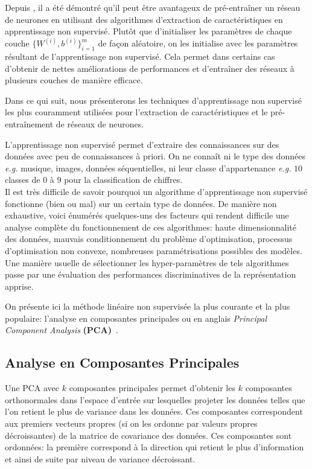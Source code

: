 Depuis \citep{Hinton06,Bengio-nips-2006}, il a été démontré qu'il peut être
avantageux de pré-entraîner un réseau de neurones en utilisant des algorithmes
d'extraction de caractéristiques en apprentissage non supervisé. Plutôt que
d'initialiser les paramètres de chaque couche $\lbrace W^{(i)},b^{(i)}
\rbrace_{i=1}^{m}$ de façon aléatoire, on les initialise avec les paramètres
résultant de l'apprentissage non supervisé.  Cela permet dans certains cas
d'obtenir de nettes améliorations de performances et d'entraîner des réseaux à
plusieurs couches de manière efficace.

Dans ce qui suit, nous présenterons les techniques d'apprentissage non
supervisé les plus couramment utilisées pour l'extraction de caractéristiques
et le pré-entraînement de réseaux de neurones.

L'apprentissage non supervisé permet d'extraire des connaissances sur des
données avec peu de connaissances à priori. On ne connaît ni le type des données
\textit{e.g.} musique, images, données séquentielles, ni leur classe
d'appartenance \textit{e.g.} $10$ classes de $0$ à $9$ pour la classification
de chiffres.  \\

Il est très difficile de savoir pourquoi un algorithme d'apprentissage non
supervisé fonctionne (bien ou mal) sur un certain type de données.  De manière
non exhaustive, voici énumérés quelques-uns des facteurs qui rendent difficile
une analyse complète du fonctionnement de ces algorithmes: haute
dimensionnalité des données, mauvais conditionnement du problème
d'optimisation, processus d'optimisation non convexe, nombreuses
paramétrisations possibles des modèles. \\

Une manière usuelle de sélectionner les hyper-paramètres de tels algorithmes passe 
par une évaluation des performances discriminatives de la
représentation apprise.

On présente ici la méthode linéaire non supervisée la plus courante et la plus
populaire: l'analyse en composantes principales ou en anglais \textit{Principal
Component Analysis} \textbf{(PCA)}~\citep{Pearson-1901,Hotelling1933}.

\subsection{Analyse en Composantes Principales} \label{sec:pca}

Une PCA avec $k$ composantes principales permet d'obtenir les $k$ composantes
orthonormales dans l'espace d'entrée sur lesquelles projeter les données telles
que l'on retient le plus de variance dans les données. Ces composantes
correspondent aux premiers vecteurs propres (si on les ordonne par valeurs
propres décroissantes) de la matrice de covariance des données.  Ces
composantes sont ordonnées: la première correspond à la direction qui retient
le plus d'information et ainsi de suite par niveau de variance décroissant.

